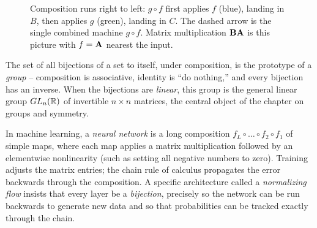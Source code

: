 \begin{figure}[H]
\centering
{}
\caption{Composition runs right to left: $g\circ f$ first applies $f$ (blue), landing in
$B$, then applies $g$ (green), landing in $C$. The dashed arrow is the single combined
machine $g\circ f$. Matrix multiplication $\mathbf{B}\mathbf{A}$ is this picture with $f=\mathbf{A}$
nearest the input.}
\label{ch38:composition}
\end{figure}

\begin{connectionbox}
The set of all bijections of a set to itself, under composition, is the prototype of a
\emph{group} -- composition is associative, identity is ``do nothing,'' and every
bijection has an inverse. When the bijections are \emph{linear}, this group is the general
linear group $GL_n(\mathbb{R})$ of invertible $n\times n$ matrices, the central object of the
chapter on groups and symmetry.
\end{connectionbox}

\begin{applicationbox}
In machine learning, a \emph{neural network} is a long composition $f_L \circ \dots \circ
f_2 \circ f_1$ of simple maps, where each map applies a matrix multiplication followed by an elementwise nonlinearity (such as setting all negative numbers to zero).
Training adjusts the matrix entries; the chain rule of calculus propagates the error backwards through the composition. A specific architecture called a \emph{normalizing flow} insists that every layer be a
\emph{bijection}, precisely so the network can be run backwards to generate new data and so
that probabilities can be tracked exactly through the chain.
\end{applicationbox}

